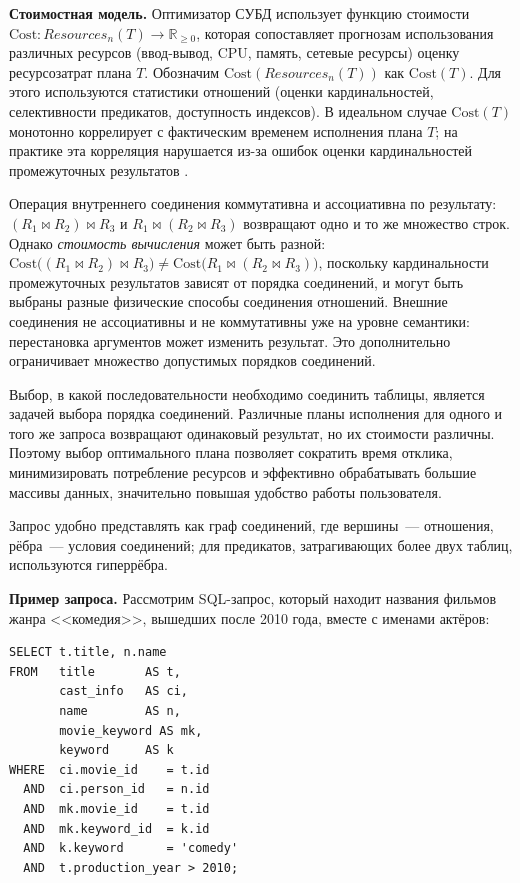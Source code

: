\textbf{Стоимостная модель.}
Оптимизатор СУБД использует функцию стоимости $\mathrm{Cost}\colon Resources_{n}(T) \to \mathbb{R}_{\geqslant 0}$, 
которая сопоставляет прогнозам использования различных ресурсов (ввод-вывод, CPU, память, сетевые ресурсы) 
оценку ресурсозатрат плана $T$. Обозначим $\mathrm{Cost}(Resources_{n}(T))$ как $\mathrm{Cost}(T)$. Для этого используются 
статистики отношений (оценки кардинальностей, селективности предикатов, доступность индексов).
В идеальном случае $\mathrm{Cost}(T)$ монотонно коррелирует с фактическим временем исполнения плана $T$;
на практике эта корреляция нарушается из-за ошибок оценки кардинальностей промежуточных результатов \cite{HowGoodJournal}.
\par

Операция внутреннего соединения коммутативна и ассоциативна по результату:
$(R_1 \Join R_2) \Join R_3$ и $R_1 \Join (R_2 \Join R_3)$ возвращают
одно и то же множество строк. Однако \emph{стоимость вычисления} может быть разной:
$\mathrm{Cost}\bigl((R_1 \Join R_2) \Join R_3\bigr) \neq
\mathrm{Cost}\bigl(R_1 \Join (R_2 \Join R_3)\bigr)$,
поскольку кардинальности промежуточных результатов зависят от порядка соединений, и могут быть выбраны разные 
физические способы соединения отношений.
Внешние соединения не ассоциативны и не коммутативны
уже на уровне семантики: перестановка аргументов может изменить результат.
Это дополнительно ограничивает множество допустимых порядков соединений.

Выбор, в какой последовательности необходимо соединить таблицы, является задачей выбора 
порядка соединений. Различные планы исполнения для одного и того же запроса возвращают 
одинаковый результат, но их стоимости различны. Поэтому 
выбор оптимального плана позволяет сократить время отклика, минимизировать 
потребление ресурсов и эффективно обрабатывать большие массивы данных, значительно 
повышая удобство работы пользователя.
\par

Запрос удобно представлять как граф соединений, где вершины~--- отношения,
рёбра~--- условия соединений; для предикатов, затрагивающих более двух таблиц,
используются гиперрёбра.
\par

\textbf{Пример запроса.}
Рассмотрим SQL-запрос, который находит названия фильмов жанра <<комедия>>,
вышедших после 2010 года, вместе с именами актёров:

\begin{center}
\begin{minipage}{0.85\textwidth}
\begin{verbatim}
SELECT t.title, n.name
FROM   title       AS t,
       cast_info   AS ci,
       name        AS n,
       movie_keyword AS mk,
       keyword     AS k
WHERE  ci.movie_id    = t.id
  AND  ci.person_id   = n.id
  AND  mk.movie_id    = t.id
  AND  mk.keyword_id  = k.id
  AND  k.keyword      = 'comedy'
  AND  t.production_year > 2010;
\end{verbatim}
\end{minipage}
\end{center}

